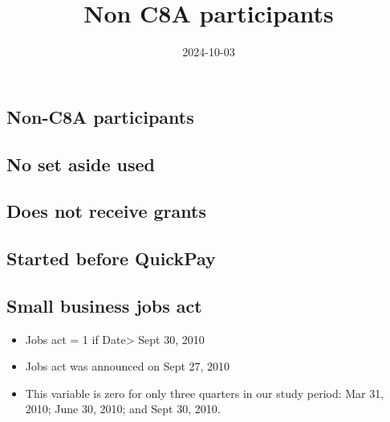 \documentclass[
]{article}
\title{Non C8A participants}
\author{}
\date{\vspace{-2.5em}2024-10-03}
\providecommand{\tightlist}{%
  \setlength{\itemsep}{0pt}\setlength{\parskip}{0pt}}
\begin{document}
\maketitle

\hypertarget{non-c8a-participants}{%
\subsection{Non-C8A participants}\label{non-c8a-participants}}

\hypertarget{no-set-aside-used}{%
\subsection{No set aside used}\label{no-set-aside-used}}

\hypertarget{does-not-receive-grants}{%
\subsection{Does not receive grants}\label{does-not-receive-grants}}

\hypertarget{started-before-quickpay}{%
\subsection{Started before QuickPay}\label{started-before-quickpay}}

\hypertarget{small-business-jobs-act}{%
\subsection{Small business jobs act}\label{small-business-jobs-act}}

\begin{itemize}
\tightlist
\item
  Jobs act = 1 if Date\textgreater{} Sept 30, 2010
\item
  Jobs act was announced on Sept 27, 2010
\item
  This variable is zero for only three quarters in our study period: Mar
  31, 2010; June 30, 2010; and Sept 30, 2010.
\end{itemize}
\end{document}
